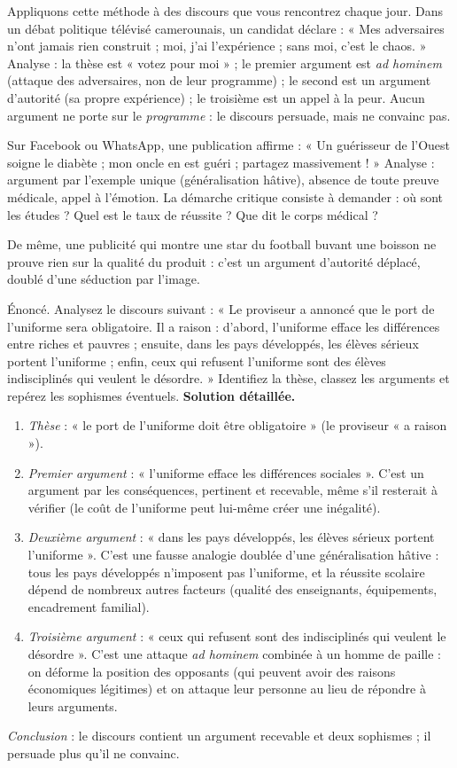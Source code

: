 \documentclass[11pt]{article}
\begin{document}
Appliquons cette méthode à des discours que vous rencontrez chaque jour. Dans un débat politique télévisé camerounais, un candidat déclare : « Mes adversaires n'ont jamais rien construit ; moi, j'ai l'expérience ; sans moi, c'est le chaos. » Analyse : la thèse est « votez pour moi » ; le premier argument est \emph{ad hominem} (attaque des adversaires, non de leur programme) ; le second est un argument d'autorité (sa propre expérience) ; le troisième est un appel à la peur. Aucun argument ne porte sur le \emph{programme} : le discours persuade, mais ne convainc pas.

Sur Facebook ou WhatsApp, une publication affirme : « Un guérisseur de l'Ouest soigne le diabète ; mon oncle en est guéri ; partagez massivement ! » Analyse : argument par l'exemple unique (généralisation hâtive), absence de toute preuve médicale, appel à l'émotion. La démarche critique consiste à demander : où sont les études ? Quel est le taux de réussite ? Que dit le corps médical ?

De même, une publicité qui montre une star du football buvant une boisson ne prouve rien sur la qualité du produit : c'est un argument d'autorité déplacé, doublé d'une séduction par l'image.

\begin{exoresolu}
Énoncé. Analysez le discours suivant : « Le proviseur a annoncé que le port de l'uniforme sera obligatoire. Il a raison : d'abord, l'uniforme efface les différences entre riches et pauvres ; ensuite, dans les pays développés, les élèves sérieux portent l'uniforme ; enfin, ceux qui refusent l'uniforme sont des élèves indisciplinés qui veulent le désordre. » Identifiez la thèse, classez les arguments et repérez les sophismes éventuels.
\tcblower
\textbf{Solution détaillée.}
\begin{enumerate}
\item \emph{Thèse} : « le port de l'uniforme doit être obligatoire » (le proviseur « a raison »).
\item \emph{Premier argument} : « l'uniforme efface les différences sociales ». C'est un argument par les conséquences, pertinent et recevable, même s'il resterait à vérifier (le coût de l'uniforme peut lui-même créer une inégalité).
\item \emph{Deuxième argument} : « dans les pays développés, les élèves sérieux portent l'uniforme ». C'est une fausse analogie doublée d'une généralisation hâtive : tous les pays développés n'imposent pas l'uniforme, et la réussite scolaire dépend de nombreux autres facteurs (qualité des enseignants, équipements, encadrement familial).
\item \emph{Troisième argument} : « ceux qui refusent sont des indisciplinés qui veulent le désordre ». C'est une attaque \emph{ad hominem} combinée à un homme de paille : on déforme la position des opposants (qui peuvent avoir des raisons économiques légitimes) et on attaque leur personne au lieu de répondre à leurs arguments.
\end{enumerate}
\emph{Conclusion} : le discours contient un argument recevable et deux sophismes ; il persuade plus qu'il ne convainc.
\end{exoresolu}
\end{document}
